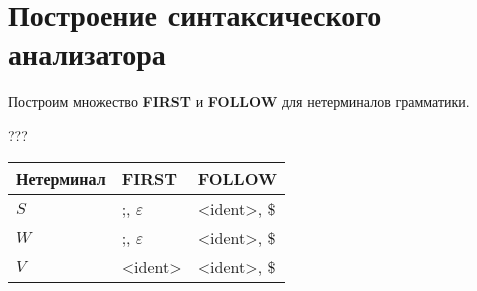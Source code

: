 \section{Построение синтаксического анализатора}

Построим множество \textbf{FIRST} и \textbf{FOLLOW} для нетерминалов грамматики.

???

\begin{center}
    \begin{tabular}{ | l | l | l | }
        \hline
        \textbf{Нетерминал} & \textbf{FIRST} & \textbf{FOLLOW} \\
        \hline
        $S$ & ;, $\varepsilon$ & <ident>, \$ \\
        \hline
        $W$ & ;, $\varepsilon$ & <ident>, \$ \\
        \hline
        $V$ & <ident> & <ident>, \$ \\
        \hline
    \end{tabular}
\end{center}

